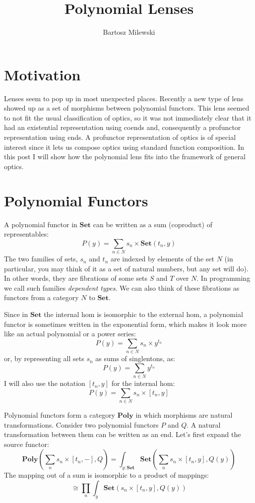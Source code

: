 \documentclass[11pt]{amsart}
\author{Bartosz Milewski}
\title{Polynomial Lenses}
\begin{document}
\maketitle{}

\section{Motivation}
Lenses seem to pop up in most unexpected places. Recently a new type of lens showed up as a set of morphisms between polynomial functors. This lens seemed to not fit the usual classification of optics, so it was not immediately clear that it had an existential representation using coends and, consequently a profunctor representation using ends. A profunctor representation of optics is of special interest since it lets us compose optics using standard function composition. In this post I will show how the polynomial lens fits into the framework of general optics.

\section{Polynomial Functors}

A polynomial functor in $\mathbf{Set}$ can be written as a sum (coproduct) of representables:
\[ P(y) = \sum_{n \in N} s_n \times \mathbf{Set}(t_n, y) \]
The two families of sets, $s_n$ and $t_n$ are indexed by elements of the set $N$ (in particular, you may think of it as a set of natural numbers, but any set will do). In other words, they are fibrations of some sets $S$ and $T$ over $N$. In programming we call such families \emph{dependent types}. We can also think of these fibrations as functors from a category $N$ to $\mathbf{Set}$. 

Since in $\mathbf{Set}$ the internal hom is isomorphic to the external hom, a polynomial functor is sometimes written in the exponential form, which makes it look more like an actual polynomial or a power series:
\[ P(y) = \sum_{n \in N} s_n \times y^{t_n} \]
or, by representing all sets $s_n$ as sums of singlentons, as:
\[ P(y) = \sum_{n \in N} y^{t_n} \]
I will also use the notation $[t_n, y]$ for the internal hom:
\[ P(y) = \sum_{n \in N} s_n \times [t_n, y] \]
  
Polynomial functors form a category $\mathbf{Poly}$ in which morphisms are natural transformations. Consider two polynomial functors $P$ and $Q$. A natural transformation between them can be written as an end. Let's first expand the source functor:
\[   \mathbf{Poly}\left( \sum_n s_n \times [t_n, -], Q\right)  =  \int_{y\colon \mathbf{Set}} \mathbf{Set} \left(\sum_n s_n \times [t_n, y], Q(y)\right)\]
The mapping out of a sum is isomorphic to a product of mappings:
\[ \cong \prod_n \int_y \mathbf{Set} \left(s_n \times [t_n, y], Q(y)\right) \]
\end{document}
